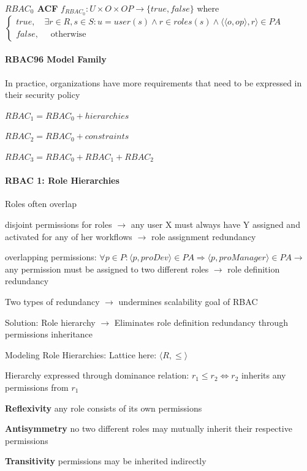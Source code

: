 \documentclass[a4paper]{article}
\renewcommand{\note}[2]{\begin{noteBox} \textbf{#1} #2 \end{noteBox}}
\begin{document}
\begin{multicols}{3}
    \note{$RBAC_0$ ACF}{
        $f_{RBAC_0}:U \times O\times OP\rightarrow\{true,false\}$ where
        $\begin{cases} true, \quad \exists r\in R,s\in S:u=user(s)\wedge r\in roles(s)\wedge \langle \langle o,op\rangle ,r\rangle \in PA \\ false, \quad\text{ otherwise } \end{cases}$
    }

    \paragraph{RBAC96 Model Family}
    In practice, organizations have more requirements that need to be expressed in their security policy
    \begin{itemize*}
        \item $RBAC_1 = RBAC_0 + hierarchies$
        \item $RBAC_2 = RBAC_0 + constraints$
        \item $RBAC_3 = RBAC_0 + RBAC_1 + RBAC_2$
    \end{itemize*}

    \paragraph{RBAC 1: Role Hierarchies}
    Roles often overlap
    \begin{enumerate*}
        \item disjoint permissions for roles $\rightarrow$ any user X must always have Y assigned and activated for any of her workflows $\rightarrow$ role assignment redundancy
        \item overlapping permissions: $\forall p\in P:\langle p,proDev\rangle \in PA\Rightarrow \langle p,proManager\rangle \in PA\rightarrow$ any permission must be assigned to two different roles $\rightarrow$ role definition redundancy
        \item Two types of redundancy $\rightarrow$ undermines scalability goal of RBAC
    \end{enumerate*}

    Solution: Role hierarchy $\rightarrow$ Eliminates role definition redundancy through permissions inheritance

    Modeling Role Hierarchies: Lattice here: $\langle R,\leq\rangle$
    \begin{itemize*}
        \item Hierarchy expressed through dominance relation: $r_1\leq r_2 \Leftrightarrow r_2$ inherits any permissions from $r_1$
        \item \textbf{Reflexivity} any role consists of its own permissions
        \item \textbf{Antisymmetry} no two different roles may mutually inherit their respective permissions
        \item \textbf{Transitivity} permissions may be inherited indirectly
    \end{itemize*}


\end{multicols}
\end{document}
